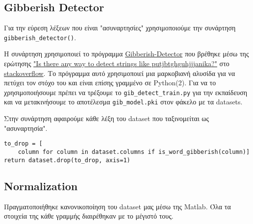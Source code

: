 \subsection{Gibberish Detector}
\sloppy Για την εύρεση λέξεων που είναι "ασυναρτησίες" χρησιμοποιούμε την συνάρτηση
\lstinline!gibberish_detector()!.

Η συνάρτηση χρησιμοποιεί το πρόγραμμα \href{https://github.com/rrenaud/Gibberish-Detector}{Gibberish-Detector}
που βρέθηκε μέσω της ερώτησης \href{http://stackoverflow.com/a/6298193/3430986}{"Is there any way to detect strings like putjbtghguhjjjanika?"}
στο \href{stackoverflow.com}{stackoverflow}.
Το πρόγραμμα αυτό χρησιμοποιεί μια μαρκοβιανή αλυσίδα για να πετύχει τον στόχο του και είναι επίσης γραμμένο σε Python(2).
Για να το χρησιμοποιήσουμε πρέπει να τρέξουμε το \texttt{gib\_detect\_train.py} για την εκπαίδευση
και να μετακινήσουμε το αποτέλεσμα \texttt{gib\_model.pki} στον φάκελο με τα datasets.

Στην συνάρτηση αφαιρούμε κάθε λέξη του dataset που ταξινομείται ως "ασυναρτησία".
\begin{lstlisting}[captionpos=none, numbers=none, breaklines=true]
to_drop = [
    column for column in dataset.columns if is_word_gibberish(column)]
return dataset.drop(to_drop, axis=1)
\end{lstlisting}

\subsection{Normalization}
Πραγματοποιήθηκε κανονικοποίηση του dataset μας μέσω της Matlab.
Όλα τα στοιχεία της κάθε γραμμής διαιρέθηκαν με το μέγιστό τους.